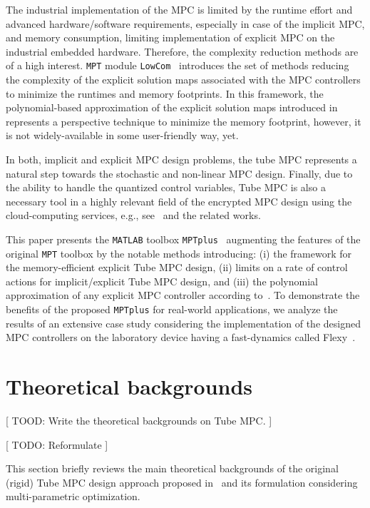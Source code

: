 \documentclass[letterpaper, 10 pt, conference]{ieeeconf}
\begin{document}
The industrial implementation of the MPC is limited by the runtime effort and advanced hardware/software requirements, especially in case of the implicit MPC, and memory consumption, limiting implementation of explicit MPC on the industrial embedded hardware. Therefore, the complexity reduction methods are of a high interest. 
\texttt{MPT} module \texttt{LowCom}~\cite{KH15} introduces the set of methods reducing the complexity of the explicit solution maps associated with the MPC controllers to minimize the runtimes and memory footprints. 
In this framework, the polynomial-based approximation of the explicit solution maps introduced in~\cite{KL11} represents a perspective technique to minimize the memory footprint, however, it is not widely-available in some user-friendly way, yet.

In both, implicit and explicit MPC design problems, the tube MPC represents a natural step towards the stochastic and non-linear MPC design. Finally, due to the ability to handle the quantized control variables, Tube MPC is also a necessary tool in a highly relevant field of the encrypted MPC design using the cloud-computing services, e.g., see~\cite{DR18} and the related works.

This paper presents the \texttt{MATLAB} toolbox \texttt{MPTplus}~\cite{MPTplus} augmenting the features of the original \texttt{MPT} toolbox by the notable methods introducing: (i) the framework for the memory-efficient explicit Tube MPC design, (ii) limits on a rate of control actions for implicit/explicit Tube MPC design, and (iii) the polynomial approximation of any explicit MPC controller according to~\cite{KL11}. To demonstrate the benefits of the proposed \texttt{MPTplus} for real-world applications, we analyze the results of an extensive case study considering the implementation of the designed MPC controllers on the laboratory device having a fast-dynamics called Flexy~\cite{CK19}. 

\section{Theoretical backgrounds}
\label{sec:tube_mpc_theory}

[ TOOD: Write the theoretical backgrounds on Tube MPC. ]

[ TODO: Reformulate ]

This section briefly reviews the main theoretical backgrounds of the original (rigid) Tube MPC design approach proposed in~\cite{MS05} and its formulation considering multi-parametric optimization.
\end{document}

